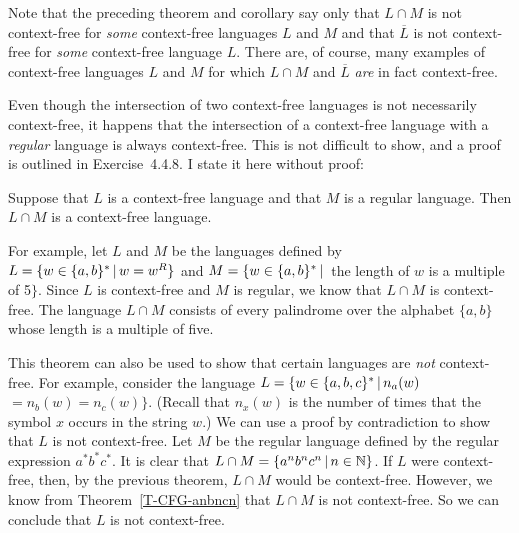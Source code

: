 Note that the preceding theorem and corollary say only that
$L\cap M$ is not context-free for \textit{some} context-free languages
$L$ and $M$ and that $\overline{L}$ is not context-free for 
\textit{some} context-free language $L$.  There are, of course, many 
examples of context-free languages $L$ and $M$ for which
$L\cap M$ and $\overline{L}$ \textit{are} in fact context-free.

Even though the intersection of two context-free languages is not necessarily
context-free, it happens that the intersection of a context-free language
with a \textit{regular} language is always context-free.  This is not difficult
to show, and a proof is outlined in Exercise~4.4.8.
I state it here without proof:

\begin{theorem}
Suppose that $L$ is a context-free language and that $M$ is a regular
language.  Then $L\cap M$ is a context-free language.
\end{theorem}

For example, let $L$ and $M$ be the languages
defined by $L=\{w\in \{a,b\}^*\,|\, w=w^R\}$ and
$M=\{w\in\{a,b\}^*\,|\,$ the length of $w$ is a multiple of 5$\}$.  Since 
$L$ is context-free and $M$ is regular, we know that
$L\cap M$ is context-free.  The language $L\cap M$ consists of
every palindrome over the alphabet $\{a,b\}$ whose length is a
multiple of five.

This theorem can also be used to show that certain languages are
\textit{not} context-free.  For example, consider the language
$L=\{w\in\{a,b,c\}^*\,|\, n_a(w)$ $=n_b(w)=n_c(w)\}$.  (Recall that
$n_x(w)$ is the number of times that the symbol $x$ occurs in the
string $w$.)  We can use a proof by contradiction to show that
$L$ is not context-free. 
Let $M$ be the regular language defined by the regular
expression $a^*b^*c^*$.  It is clear that
$L\cap M=\{a^nb^nc^n\,|\, n\in{\mathbb N}\}$.  If $L$ were context-free,
then, by the previous theorem, $L\cap M$ would be context-free.
However, we know from Theorem~\ref{T-CFG-anbncn} that $L\cap M$
is not context-free.  So we can conclude that $L$ is not
context-free.


